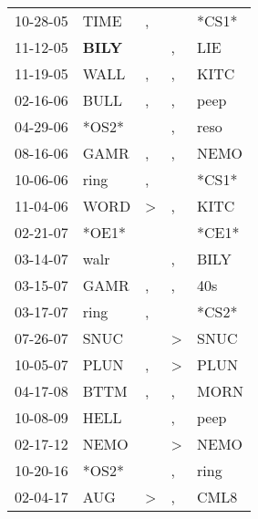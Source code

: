 \begin{supertabular}{p{0.07\textwidth}p{0.06\textwidth}p{0.02\textwidth}p{0.02\textwidth}p{0.06\textwidth}}
 10-28-05\textsuperscript{} &           TIME\textsuperscript{} &             , &               &                   *CS1* \\
 11-12-05\textsuperscript{} &  \textbf{BILY\textsuperscript{}} &               &             , &   LIE\textsuperscript{} \\
 11-19-05\textsuperscript{} &           WALL\textsuperscript{} &             , &             , &  KITC\textsuperscript{} \\
 02-16-06\textsuperscript{} &           BULL\textsuperscript{} &             , &             , &  peep\textsuperscript{} \\
 04-29-06\textsuperscript{} &                            *OS2* &               &             , &  reso\textsuperscript{} \\
 08-16-06\textsuperscript{} &           GAMR\textsuperscript{} &             , &             , &  NEMO\textsuperscript{} \\
 10-06-06\textsuperscript{} &           ring\textsuperscript{} &             , &               &                   *CS1* \\
 11-04-06\textsuperscript{} &           WORD\textsuperscript{} &  \textgreater &             , &  KITC\textsuperscript{} \\
 02-21-07\textsuperscript{} &                            *OE1* &               &               &                   *CE1* \\
 03-14-07\textsuperscript{} &           walr\textsuperscript{} &               &             , &  BILY\textsuperscript{} \\
 03-15-07\textsuperscript{} &           GAMR\textsuperscript{} &             , &             , &   40s\textsuperscript{} \\
 03-17-07\textsuperscript{} &           ring\textsuperscript{} &             , &               &                   *CS2* \\
 07-26-07\textsuperscript{} &           SNUC\textsuperscript{} &               &  \textgreater &  SNUC\textsuperscript{} \\
 10-05-07\textsuperscript{} &           PLUN\textsuperscript{} &             , &  \textgreater &  PLUN\textsuperscript{} \\
 04-17-08\textsuperscript{} &           BTTM\textsuperscript{} &             , &             , &  MORN\textsuperscript{} \\
 10-08-09\textsuperscript{} &           HELL\textsuperscript{} &               &             , &  peep\textsuperscript{} \\
 02-17-12\textsuperscript{} &           NEMO\textsuperscript{} &               &  \textgreater &  NEMO\textsuperscript{} \\
 10-20-16\textsuperscript{} &                            *OS2* &               &             , &  ring\textsuperscript{} \\
 02-04-17\textsuperscript{} &            AUG\textsuperscript{} &  \textgreater &             , &  CML8\textsuperscript{} \\
\end{supertabular}
